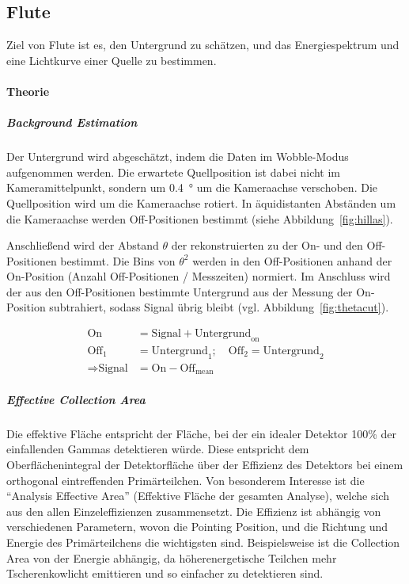 \subsection{Flute}%
\label{sub:flute}

Ziel von Flute ist es,
den Untergrund zu schätzen,
und das Energiespektrum und
eine Lichtkurve einer Quelle zu bestimmen.

\paragraph{Theorie}%

\subparagraph{Background Estimation}
Der Untergrund wird abgeschätzt,
indem die Daten im Wobble-Modus aufgenommen werden.
Die erwartete Quellposition ist dabei nicht im
Kameramittelpunkt,
sondern um
\SI{0.4}{\degree} um die Kameraachse
verschoben.
Die Quellposition wird um die Kameraachse rotiert.
In äquidistanten Abständen um die Kameraachse werden Off-Positionen bestimmt
(siehe Abbildung~\ref{fig:hillas}).

Anschließend wird der Abstand $\theta$ der rekonstruierten
zu der On- und den Off-Positionen bestimmt.
Die Bins von $\theta^2$ werden in den Off-Positionen
anhand der On-Position (Anzahl Off-Positionen / Messzeiten) normiert.
Im Anschluss wird der aus den Off-Positionen bestimmte Untergrund
aus der Messung der On-Position subtrahiert, sodass Signal übrig bleibt
(vgl. Abbildung~\ref{fig:thetacut}).


\begin{align*}
  \text{On} &= \text{Signal} + \text{Untergrund}_{\text{on}} \\
  \text{Off}_{1} &= \text{Untergrund}_{1} ;
  \quad \text{Off}_{2} = \text{Untergrund}_{2} \\
  \Rightarrow \text{Signal} &= \text{On} - \text{Off}_{\text{mean}}
\end{align*}

\subparagraph{Effective Collection Area}
Die effektive Fläche entspricht der Fläche,
bei der ein idealer Detektor 100\%
der einfallenden Gammas detektieren würde.
Diese entspricht dem Oberflächenintegral der Detektorfläche
über der Effizienz des Detektors
bei einem orthogonal eintreffenden Primärteilchen.
Von besonderem Interesse ist die \enquote{Analysis Effective Area}
(Effektive Fläche der gesamten Analyse),
welche sich aus den allen Einzeleffizienzen zusammensetzt.
Die Effizienz ist abhängig von verschiedenen Parametern,
wovon die Pointing Position,
und die Richtung und Energie des Primärteilchens
die wichtigsten sind.
Beispielsweise ist die Collection Area von der Energie abhängig,
da höherenergetische Teilchen mehr Tscherenkowlicht emittieren
und so einfacher zu detektieren sind.

